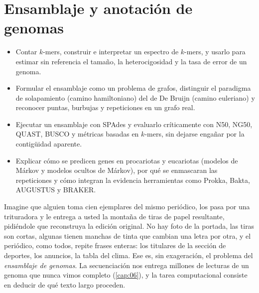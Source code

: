 \chapter{Ensamblaje y anotación de genomas}\label{cap:08}


\begin{objetivos}
\begin{itemize}
  \item Contar $k$-mers, construir e interpretar un espectro de $k$-mers, y usarlo para estimar sin referencia el tamaño, la heterocigosidad y la tasa de error de un genoma.
  \item Formular el ensamblaje como un problema de grafos, distinguir el paradigma de solapamiento (camino hamiltoniano) del de De Bruijn (camino euleriano) y reconocer puntas, burbujas y repeticiones en un grafo real.
  \item Ejecutar un ensamblaje con SPAdes y evaluarlo críticamente con N50, NG50, QUAST, BUSCO y métricas basadas en $k$-mers, sin dejarse engañar por la contigüidad aparente.
  \item Explicar cómo se predicen genes en procariotas y eucariotas (modelos de Márkov y modelos ocultos de Márkov), por qué se enmascaran las repeticiones y cómo integran la evidencia herramientas como Prokka, Bakta, AUGUSTUS y BRAKER.
\end{itemize}
\end{objetivos}

Imagine que alguien toma cien ejemplares del mismo periódico, los pasa por una trituradora y le entrega a usted la montaña de tiras de papel resultante, pidiéndole que reconstruya la edición original. No hay foto de la portada, las tiras son cortas, algunas tienen manchas de tinta que cambian una letra por otra, y el periódico, como todos, repite frases enteras: los titulares de la sección de deportes, los anuncios, la tabla del clima. Ese es, sin exageración, el problema del \emph{ensamblaje de genomas}. La secuenciación nos entrega millones de lecturas de un genoma que nunca vimos completo (\cref{cap:06}), y la tarea computacional consiste en deducir de qué texto largo proceden.

